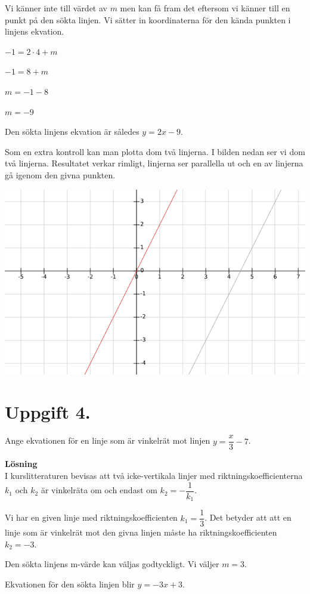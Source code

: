 \documentclass{article}
\begin{document}
Vi känner inte till värdet av $m$ men kan få fram det eftersom vi känner till en punkt på den sökta linjen. Vi sätter in koordinaterna för den kända punkten i linjens ekvation.

$-1 = 2 \cdot 4 + m$

$-1 = 8 + m$

$m = -1 - 8$

$m = -9$

Den sökta linjens ekvation är således $y = 2x - 9$.

Som en extra kontroll kan man plotta dom två linjerna. I bilden nedan ser vi dom två linjerna. Resultatet verkar rimligt, linjerna ser parallella ut och en av linjerna gå igenom den givna punkten. 

\includegraphics[scale=0.65]{graph_1_3_1.png} 

\section*{Uppgift 4.}
Ange ekvationen för en linje som är vinkelrät mot linjen $y=\dfrac{x}{3}-7$.

\textbf{Lösning}\\
I kurslitteraturen bevisas att två icke-vertikala linjer med riktningskoefficienterna $k_{1}$ och $k_{2}$ är vinkelräta om och endast om $k_{2} = -\dfrac{1}{k_{1}}$.

Vi har en given linje med riktningskoefficienten $k_{1} = \dfrac{1}{3}$. Det betyder att att en linje som är vinkelrät mot den givna linjen måste ha  riktningskoefficienten $k_{2}=-3$.

Den sökta linjens m-värde kan väljas godtyckligt. Vi väljer $m = 3$.

Ekvationen för den sökta linjen blir $y = -3x + 3$.
\end{document}
